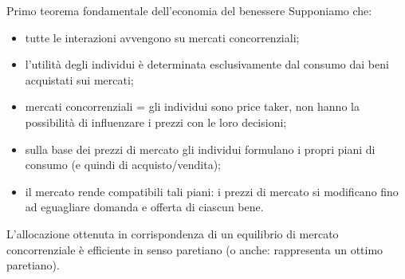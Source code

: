 \documentclass[aspectratio=149,11pt]{beamer}
\begin{document}
\begin{frame}{Primo teorema fondamentale dell’economia del benessere}
Supponiamo che:
\begin{itemize}
\item tutte le interazioni avvengono su mercati concorrenziali;
\item l’utilità degli individui è determinata esclusivamente dal consumo dai beni
acquistati sui mercati;
\item mercati concorrenziali = gli individui sono price taker, non hanno la
possibilità di influenzare i prezzi con le loro decisioni;
\item sulla base dei prezzi di mercato gli individui formulano i propri piani di
consumo (e quindi di acquisto/vendita);
\item il mercato rende compatibili tali piani: i prezzi di mercato si modificano
fino ad eguagliare domanda e offerta di ciascun bene.
\end{itemize}
\begin{block}{}
L’allocazione ottenuta in corrispondenza di un equilibrio di mercato concorrenziale è efficiente in senso paretiano (o anche: rappresenta un ottimo paretiano).
\end{block}
\end{frame}
\end{document}
